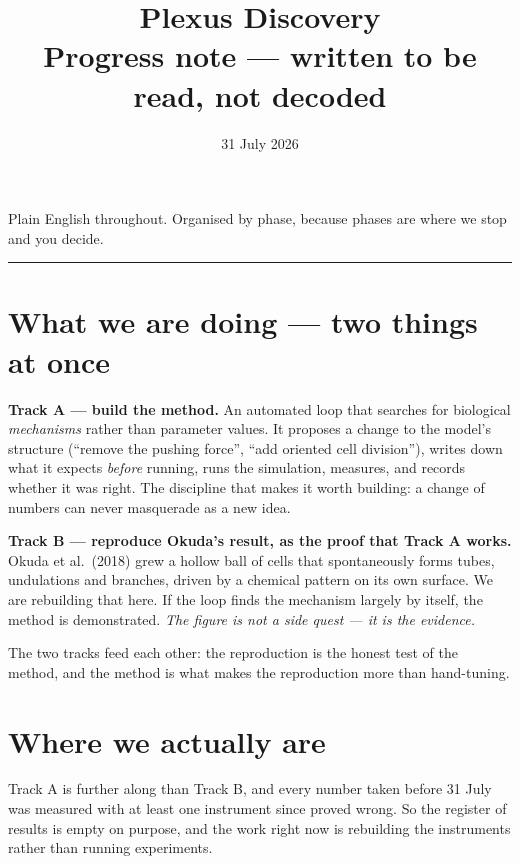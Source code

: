 \documentclass[11pt,a4paper]{article}
\title{\textbf{Plexus Discovery}\\[6pt]
\large Progress note --- written to be read, not decoded}
\author{}
\date{31 July 2026}
\begin{document}
\maketitle
\vspace{-2.2\baselineskip}

\begin{center}\small\color{grey}
Plain English throughout. Organised by phase, because phases are where we stop and you decide.
\end{center}

\vspace{4pt}
\hrule
\vspace{10pt}

\section{What we are doing --- two things at once}

\textbf{Track A --- build the method.} An automated loop that searches for biological
\emph{mechanisms} rather than parameter values. It proposes a change to the model's structure
(``remove the pushing force'', ``add oriented cell division''), writes down what it expects
\emph{before} running, runs the simulation, measures, and records whether it was right. The
discipline that makes it worth building: a change of numbers can never masquerade as a new idea.

\textbf{Track B --- reproduce Okuda's result, as the proof that Track A works.} Okuda et al.\
(2018) grew a hollow ball of cells that spontaneously forms tubes, undulations and branches,
driven by a chemical pattern on its own surface. We are rebuilding that here. If the loop finds
the mechanism largely by itself, the method is demonstrated. \emph{The figure is not a side quest
--- it is the evidence.}

The two tracks feed each other: the reproduction is the honest test of the method, and the method
is what makes the reproduction more than hand-tuning.

\section{Where we actually are}

Track A is further along than Track B, and every number taken before 31 July was measured with at
least one instrument since proved wrong. So the register of results is empty on purpose, and the
work right now is rebuilding the instruments rather than running experiments.
\end{document}
